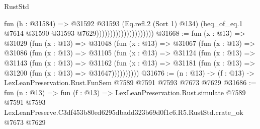 \begin{lexlean}{RustStd}
\begin{coremodule}
                                          fun (h : @31584) =>
                                          @31592
                                            @31593
                                            (Eq.refl.{2} (Sort 1) @134)
                                            (heq_of_eq.{1}
                                              @7614
                                              @31590
                                              @31593
                                              @7629)))))))))))))))))))))
@31668 := fun (x : @13) =>
  @31029
    (fun (x : @13) =>
    @31048
      (fun (x : @13) =>
      @31067
        (fun (x : @13) =>
        @31086
          (fun (x : @13) =>
          @31105
            (fun (x : @13) =>
            @31124
              (fun (x : @13) =>
              @31143
                (fun (x : @13) =>
                @31162
                  (fun (x : @13) =>
                  @31181 (fun (x : @13) => @31200 (fun (x : @13) => @31647))))))))))
@31676 := (n : @13) -> (f : @13) -> LexLeanPreservation.Rust.FunSem @7589 @7591 @7593 @7673 @7629
@31686 := fun (n : @13) =>
  fun (f : @13) =>
  LexLeanPreservation.Rust.simulate
    @7589
    @7591
    @7593
    LexLeanPreserve.C3df453b80ed6295dbadd323b69d0f1c6.R5.RustStd.crate_ok
    @7673
    @7629
\end{coremodule}
\end{lexlean}
